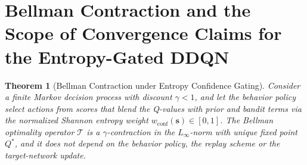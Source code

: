 \documentclass{article}
\newtheorem{theorem}{Theorem}
\begin{document}
\section{Bellman Contraction and the Scope of Convergence Claims for the Entropy-Gated DDQN}

\begin{theorem}[Bellman Contraction under Entropy Confidence Gating]
Consider a finite Markov decision process with discount $\gamma < 1$, and let the behavior policy select actions from scores that blend the Q-values with prior and bandit terms via the normalized Shannon entropy weight $w_{\text{conf}}(\mathbf{s}) \in [0, 1]$. The Bellman optimality operator $\mathcal{T}$ is a $\gamma$-contraction in the $L_\infty$-norm with unique fixed point $Q^*$, and it does not depend on the behavior policy, the replay scheme or the target-network update.
\end{theorem}
\end{document}
